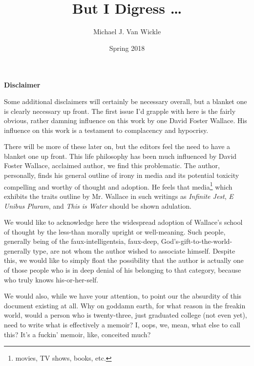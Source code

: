 

\pagecolor{WhiteSmoke}

\title{But I Digress \ldots}
\author{Michael J. Van Wickle}
\date{Spring 2018}


\frontmatter
\pagestyle{empty}

\begin{titlepage}
\customtitlepage
\end{titlepage}

\posttitlepage
\newpage

\renewcommand{\thefootnote}{\fnsymbol{footnote}}
\pagestyle{fancy}
\fancyhf{}
\renewcommand{\chaptermark}[1]{\markboth{#1}{}}
\renewcommand{\sectionmark}[1]{\markright{#1}}
\fancyhead[ER]{\nouppercase{\rightmark}}
\fancyhead[OL]{\nouppercase{\leftmark}}
\fancyfoot[EL,OR]{\thepage}

\setlength{\parskip}{\baselineskip}
\newcommand{\editorsnote}{Disclaimer}
{\centering\bfseries\Large \editorsnote}
\markright{\editorsnote}\addcontentsline{toc}{chapter}{\editorsnote}

\vspace*{\fill}
{\normalsize Some additional disclaimers will certainly be necessary overall, but a blanket one is clearly necessary up front.
The first issue I'd grapple with here is the fairly obvious, rather damning influence on this work by one David Foster Wallace.
His influence on this work is a testament to complacency and hypocrisy.}

{\normalsize There will be more of these later on, but the editors feel the need to have a blanket one up front.
This life philosophy has been much influenced by David Foster Wallace, acclaimed author, we find this problematic.
The author, personally, finds his general outline of irony in media and its potential toxicity compelling and worthy of thought and adoption.
He feels that media\footnote{movies, TV shows, books, etc.} which exhibits the traits outline by Mr. Wallace in such writings as \textit{Infinite Jest}\autocite{infjest}, \textit{E Unibus Pluram}, and \textit{This is Water} should be shown adulation.

We would like to acknowledge here the widespread adoption of Wallace's school of thought by the less-than morally upright or well-meaning.\autocite{elonwallace}
Such people, generally being of the faux-intelligentsia, faux-deep, God's-gift-to-the-world-generally type, are not whom the author wished to associate himself.
Despite this, we would like to simply float the possibility that the author is actually one of those people who is in deep denial of his belonging to that category, because who truly knows his-or-her-self.

We would also, while we have your attention, to point our the absurdity of this document existing at all.
Why on goddamn earth, for what reason in the freakin world, would a person who is twenty-three, just graduated college (not even yet), need to write what is effectively a memoir?
I, oops, we, mean, what else to call this?
It's a fuckin' memoir, like, conceited much?\margincol{}}

